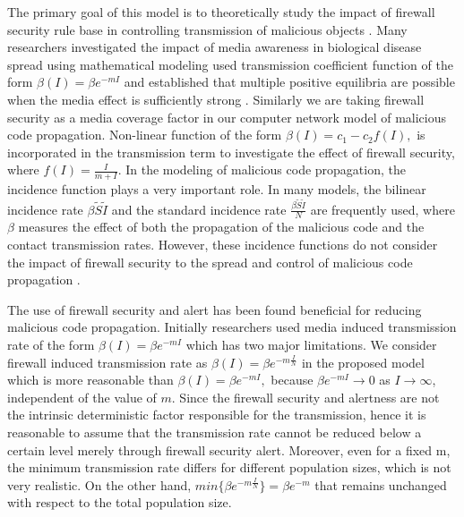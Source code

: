 \documentclass[conference]{IEEEtran}
\begin{document}
\indent The primary goal of this model is to theoretically study the impact of firewall security rule base in controlling transmission of malicious objects \cite{misra2014capturing}. Many researchers investigated the impact of media awareness in biological disease spread using mathematical modeling used transmission coefficient function of the form $\beta(I)=\beta e^{-mI}$ and established that multiple positive equilibria are possible when the media effect is sufficiently strong \cite{cui2008impact, liu2008impact, sahu2012, sahu2015dynamics}. Similarly we are taking firewall security as a media coverage factor in our computer network model of malicious code propagation. Non-linear function of the form $\beta(I) = c_1 - c_2 f (I),$ is incorporated in the transmission term to investigate the effect of firewall security, where $f(I)=\frac{I}{m+I}$. In the modeling of malicious code propagation, the incidence function plays a very important role. In many models, the bilinear incidence rate $\beta \tilde{S}\tilde{I}$ and the standard incidence rate $\frac{\beta\tilde{S}\tilde{I}}{N}$ are frequently used, where $\beta$ measures the effect of both the propagation of the malicious code and the contact transmission rates. However, these incidence functions do not consider the impact of firewall security to the spread and control of malicious code propagation \cite{sun2014impact}.

\indent The use of firewall security and alert has been found beneficial for reducing malicious code propagation. Initially researchers used media induced transmission rate of the form $\beta(I)=\beta e^{-mI}$ which has two major limitations. We consider firewall induced transmission rate as $\beta(I)=\beta e^{-m\frac{I}{N}}$ in the proposed model which is more reasonable than $\beta(I)=\beta e^{-mI},$ because $\beta e^{-mI}\rightarrow 0$ as $I\rightarrow \infty$, independent of the value of $m$. Since the firewall security and alertness are not the intrinsic deterministic factor responsible for the transmission, hence it is reasonable to assume that the transmission rate cannot be reduced below a certain level merely through firewall security alert. Moreover, even for a fixed m, the minimum transmission rate differs for different population sizes, which is not very realistic. On the other hand, $min\{\beta e^{-m\frac{I}{N}}\} = \beta e^{-m}$ that remains unchanged with respect to the total population size.\\
\end{document}
